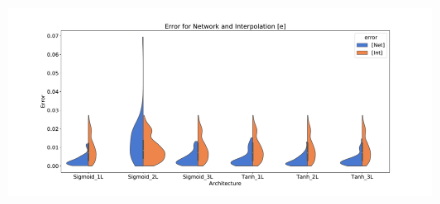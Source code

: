 \documentclass[12pt,a4paper,final]{report}			%
\begin{document}

\vspace{1cm}
\begin{figure}[!ht]
    \centering
    \includegraphics[width=\linewidth]{../figures/violin_plot_e.pdf}
\end{figure}
\end{document}
